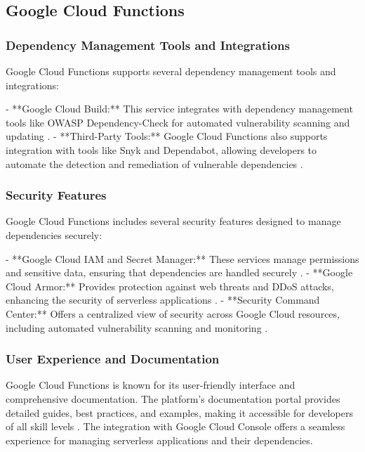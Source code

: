\documentclass[12pt, letterpaper]{article}
\begin{document}
\subsection{Google Cloud Functions}

\subsubsection{Dependency Management Tools and Integrations}

Google Cloud Functions supports several dependency management tools and integrations:

- **Google Cloud Build:** This service integrates with dependency management tools like OWASP Dependency-Check for automated vulnerability scanning and updating \cite{googleBuild2023}.
- **Third-Party Tools:** Google Cloud Functions also supports integration with tools like Snyk and Dependabot, allowing developers to automate the detection and remediation of vulnerable dependencies \cite{googlesnyk2023}.

\subsubsection{Security Features}

Google Cloud Functions includes several security features designed to manage dependencies securely:

- **Google Cloud IAM and Secret Manager:** These services manage permissions and sensitive data, ensuring that dependencies are handled securely \cite{googleSecurity2023}.
- **Google Cloud Armor:** Provides protection against web threats and DDoS attacks, enhancing the security of serverless applications \cite{googleArmor2023}.
- **Security Command Center:** Offers a centralized view of security across Google Cloud resources, including automated vulnerability scanning and monitoring \cite{googleSCC2023}.

\subsubsection{User Experience and Documentation}

Google Cloud Functions is known for its user-friendly interface and comprehensive documentation. The platform's documentation portal provides detailed guides, best practices, and examples, making it accessible for developers of all skill levels \cite{googleDocs2023}. The integration with Google Cloud Console offers a seamless experience for managing serverless applications and their dependencies.
\end{document}
